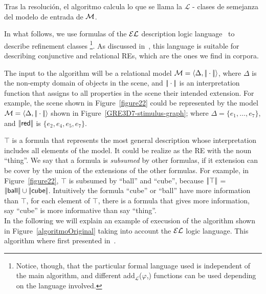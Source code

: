 Tras la resoluci\'on, el algoritmo calcula lo que se llama la
$\mathcal{L}$ - clases de semejanza del modelo de entrada de $\mathcal{M}$.


In what follows, we use formulas of the $\mathcal{EL}$ description logic
language~\cite{baad:desc03} to describe refinement classes
\footnote{Notice, though, that the particular formal language used is
  independent of the main algorithm, and different
  add$_{\mathcal{L}}$($\varphi$,\RE) functions can be used depending
  on the language involved.}.  As discussed
in~\cite{arec2:2008:Areces}, this language is suitable for describing
conjunctive and relational REs, which are the ones we find in corpora.

 The input to the algorithm will be a relational model $\mathcal{M} =
 \langle \Delta, |\!|\cdot|\!| \rangle$, where $\Delta$ is the non-empty domain
 of objects in the scene, and $|\!|\cdot|\!|$ is an interpretation
 function that assigns to all properties in the scene their intended
 extension.  For example, the scene shown in Figure~\ref{figure22}
 could be represented by the model $\mathcal{M}=\langle \Delta,|\!|\cdot|\!| \rangle$
 shown in Figure~\ref{GRE3D7-stimulus-graph}; where $\Delta =
 \{e_1,\ldots,e_7\}$, and $|\!|\textsf{red}|\!|$ is $\{e_2, e_4, e_5,
 e_7\}$.

$\top$ is a formula that represents the most general description whose
interpretation includes all elements of the model. It could be realize
as the RE with the noun ``\textsf{thing}''. We say that a formula is
\emph{subsumed} by other formulas, if it extension can be cover by the
union of the extensions of the other formulas. For example, in
Figure~\ref{figure22}, $\top$ is subsumed by ``\textsf{ball}'' and
``\textsf{cube}'', because $|\!|\top|\!|$ = $|\!|\textsf{ball}|\!|
\cup |\!|\textsf{cube}|\!|$.
Intuitively the formula ``\textsf{cube}'' or ``\textsf{ball}'' have more information than $\top$, for each element of $\top$, there is a formula that gives more information, say ``\textsf{cube}'' is more informative than say ``\textsf{thing}''.\\

In the following we will explain an example of execusion of the
algorithm shown in Figure~\ref{algoritmoOriginal} taking into account
the $\mathcal{EL}$ logic language. This algorithm where first presented
in~\cite{arec2:2008:Areces}.

